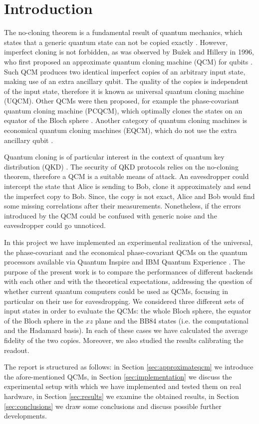 \chapter{Introduction}
\label{sec:introduction}
The no-cloning theorem is a fundamental result of quantum mechanics, which states that a generic quantum state can not be copied exactly \cite{Wootters1982}.
However, imperfect cloning is not forbidden, as was observed by Bu\ifmmode {}\else \v{z}\fi{}ek and Hillery in 1996,
who first proposed an approximate quantum cloning machine (QCM) for qubits \cite{Buzek1996}.
Such QCM produces two identical imperfect copies of an arbitrary input state, making use of an extra ancillary qubit. 
The quality of the copies is independent of the input state, therefore it is known as universal quantum cloning machine (UQCM).
Other QCMs were then proposed, for example the phase-covariant quantum cloning machine (PCQCM), 
which optimally clones the states on an equator of the Bloch sphere \cite{PhaseCovariantOptimalBruss}.
Another category of quantum cloning machines is economical quantum cloning machines (EQCM), which do not use the extra ancillary qubit \cite{EconomicalNiuGriffiths}. 

Quantum cloning is of particular interest in the context of quantum key distribution (QKD) \cite{QuantumCloningReviewScarani}. 
The security of QKD protocols relies on the no-cloning theorem, therefore a QCM is a suitable means of attack.
An eavesdropper could intercept the state that Alice is sending to Bob, clone it approximately and send the imperfect copy to Bob.
Since, the copy is not exact, Alice and Bob would find some missing correlations after their measurements.
Nonetheless, if the errors introduced by the QCM could be confused with generic noise and the eavesdropper could go unnoticed.

In this project we have implemented an experimental realization of the universal, the phase-covariant and the economical phase-covariant QCMs on the quantum processors available via Quantum Inspire \cite{quantuminspire} and IBM Quantum Experience \cite{ibmquantumexperience}.
The purpose of the present work is to compare the performances of different backends with each other and with the theoretical expectations,
addressing the question of whether current quantum computers could be used as QCMs, focusing in particular on their use for eavesdropping.
We considered three different sets of input states in order to evaluate the QCMs: the whole Bloch sphere, the equator of the Bloch sphere in the $xz$ plane and the BB84 states (i.e. the computational and the Hadamard basis).
In each of these cases we have calculated the average fidelity of the two copies.
Moreover, we also studied the results calibrating the readout.

The report is structured as follows: 
in Section \ref{sec:approximateqcm} we introduce the afore-mentioned QCMs, 
in Section \ref{sec:implementation} we discuss the experimental setup with which we have implemented and tested them on real hardware,
in Section \ref{sec:results} we examine the obtained results,
in Section \ref{sec:conclusions} we draw some conclusions and discuss possible further developments.
